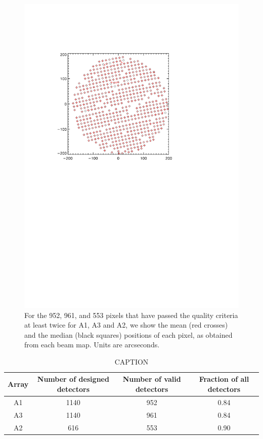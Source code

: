 \begin{figure}[htp]
\begin{center}
\includegraphics[trim=2cm 14cm 5cm 4cm, clip=true,width=0.6\linewidth]{Figures/A2_test_positions.pdf}
\caption{For the 952, 961, and 553 pixels that
  have passed the quality criteria at least twice for A1, A3 and A2,
  we show the mean (red crosses) and the median (black squares)
  positions of each pixel, as obtained from each beam map.
  Units are arcseconds. }
\label{fig:mean_vs_median}
\end{center}
\end{figure}


\begin{table}[ht]
  \label{tab:number_of_kids}
  \begin{tabular}{|c|c|c|c|}
    \hline
    Array & Number of designed detectors &  Number of valid detectors & Fraction of all detectors\\
    \hline
    A1 & 1140 & 952 &  0.84\\
    A3 & 1140 & 961 &  0.84\\
    A2 & 616  & 553 &  0.90\\
    \hline
  \end{tabular}
  \caption{ CAPTION}
  \label{tab:nbkids}
\end{table}
